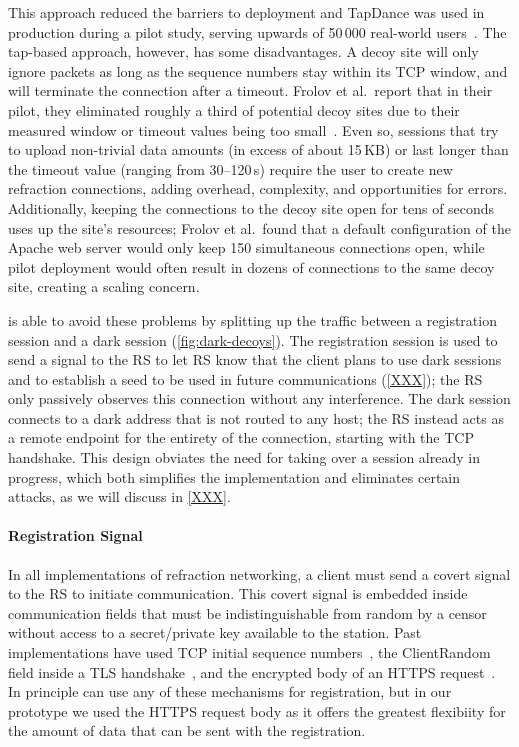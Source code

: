 This approach reduced the barriers to deployment and TapDance was used in production during a pilot study, serving upwards of 50\,000 real-world users~\cite{frolov2017isp}.  The tap-based approach, however, has some disadvantages. A decoy site will only ignore packets as long as the sequence numbers stay within its TCP window, and will terminate the connection after a timeout. Frolov et al.\ report that in their pilot, they eliminated roughly a third of potential decoy sites due to their measured window or timeout values being too small~\cite{frolov2017isp}. Even so, sessions that try to upload non-trivial data amounts (in excess of about 15\,KB) or last longer than the timeout value (ranging from 30--120\,s) require the user to create new refraction connections, adding overhead, complexity, and opportunities for errors. Additionally, keeping the connections to the decoy site open for tens of seconds uses up the site's resources; Frolov et al.\ found that a default configuration of the Apache web server would only keep 150 simultaneous connections open, while pilot deployment would often result in dozens of connections to the same decoy site, creating a scaling concern.

\scheme is able to avoid these problems by splitting up the traffic between a registration session and a dark session  (\cref{fig:dark-decoys}). The registration session is used to send a signal to the RS to let RS know that the client plans to use dark sessions and to establish a seed to be used in future communications (\cref{XXX}); the RS only passively observes this connection without any interference. The dark session connects to a dark address that is not routed to any host; the RS instead acts as a remote endpoint for the entirety of the connection, starting with the TCP handshake. This design obviates the need for taking over a session already in progress, which both simplifies the implementation and eliminates certain attacks, as we will discuss in \cref{XXX}.

\paragraph{Registration Signal} In all implementations of refraction networking, a client must send a covert signal to the RS to initiate communication. This covert signal is  embedded inside communication fields that must be indistinguishable from random by a censor without access to a secret/private key available to the station. Past implementations have used TCP initial sequence numbers~\cite{cirripede11}, the ClientRandom field inside a TLS handshake~\cite{curveball11,telex11}, and the encrypted body of an HTTPS request~\cite{tapdance14}. In principle \scheme can use any of these mechanisms for registration, but in our prototype we used the HTTPS request body as it offers the greatest flexibiity for the amount of data that can be sent with the registration.
